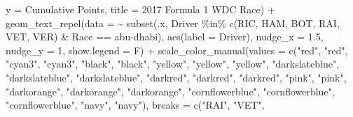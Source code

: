 \documentclass[
]{book}
\newenvironment{Shaded}{\begin{snugshade}}{\end{snugshade}}
\newcommand{\AttributeTok}[1]{\textcolor[rgb]{0.77,0.63,0.00}{#1}}
\newcommand{\DecValTok}[1]{\textcolor[rgb]{0.00,0.00,0.81}{#1}}
\newcommand{\FloatTok}[1]{\textcolor[rgb]{0.00,0.00,0.81}{#1}}
\newcommand{\FunctionTok}[1]{\textcolor[rgb]{0.00,0.00,0.00}{#1}}
\newcommand{\NormalTok}[1]{#1}
\newcommand{\SpecialCharTok}[1]{\textcolor[rgb]{0.00,0.00,0.00}{#1}}
\newcommand{\StringTok}[1]{\textcolor[rgb]{0.31,0.60,0.02}{#1}}
\begin{document}
\begin{Shaded}
\begin{Highlighting}[]
       \AttributeTok{y =} \StringTok{\textquotesingle{}Cumulative Points\textquotesingle{}}\NormalTok{,}
       \AttributeTok{title =} \StringTok{\textquotesingle{}2017 Formula 1 WDC Race\textquotesingle{}}\NormalTok{) }\SpecialCharTok{+} \FunctionTok{geom\_text\_repel}\NormalTok{(}\AttributeTok{data =} \SpecialCharTok{\textasciitilde{}} \FunctionTok{subset}\NormalTok{(.x, Driver }\SpecialCharTok{\%in\%} \FunctionTok{c}\NormalTok{(}\StringTok{\textquotesingle{}RIC\textquotesingle{}}\NormalTok{, }\StringTok{\textquotesingle{}HAM\textquotesingle{}}\NormalTok{, }\StringTok{\textquotesingle{}BOT\textquotesingle{}}\NormalTok{, }\StringTok{\textquotesingle{}RAI\textquotesingle{}}\NormalTok{, }\StringTok{\textquotesingle{}VET\textquotesingle{}}\NormalTok{, }\StringTok{\textquotesingle{}VER\textquotesingle{}}\NormalTok{) }\SpecialCharTok{\&}\NormalTok{ Race }\SpecialCharTok{==} \StringTok{\textquotesingle{}abu{-}dhabi\textquotesingle{}}\NormalTok{),}
            \FunctionTok{aes}\NormalTok{(}\AttributeTok{label =}\NormalTok{ Driver),}
            \AttributeTok{nudge\_x =} \FloatTok{1.5}\NormalTok{, }\AttributeTok{nudge\_y =} \DecValTok{1}\NormalTok{, }\AttributeTok{show.legend =}\NormalTok{ F) }\SpecialCharTok{+} 
  \FunctionTok{scale\_color\_manual}\NormalTok{(}\AttributeTok{values =} \FunctionTok{c}\NormalTok{(}\StringTok{"red"}\NormalTok{, }\StringTok{"red"}\NormalTok{, }
                                \StringTok{"cyan3"}\NormalTok{, }\StringTok{"cyan3"}\NormalTok{, }
                                \StringTok{"black"}\NormalTok{, }\StringTok{"black"}\NormalTok{, }
                                \StringTok{"yellow"}\NormalTok{, }\StringTok{"yellow"}\NormalTok{, }\StringTok{"yellow"}\NormalTok{,}
                                \StringTok{"darkslateblue"}\NormalTok{, }\StringTok{"darkslateblue"}\NormalTok{, }\StringTok{"darkslateblue"}\NormalTok{, }
                                \StringTok{"darkred"}\NormalTok{, }\StringTok{"darkred"}\NormalTok{, }\StringTok{"darkred"}\NormalTok{, }
                                \StringTok{"pink"}\NormalTok{, }\StringTok{"pink"}\NormalTok{, }
                                \StringTok{"darkorange"}\NormalTok{, }\StringTok{"darkorange"}\NormalTok{, }\StringTok{"darkorange"}\NormalTok{,}
                                \StringTok{"cornflowerblue"}\NormalTok{, }\StringTok{"cornflowerblue"}\NormalTok{, }\StringTok{"cornflowerblue"}\NormalTok{,}
                                \StringTok{"navy"}\NormalTok{, }\StringTok{"navy"}\NormalTok{),}
                     \AttributeTok{breaks =} \FunctionTok{c}\NormalTok{(}\StringTok{"RAI"}\NormalTok{, }\StringTok{"VET"}\NormalTok{,}

\end{Highlighting}
\end{Shaded}
\end{document}
